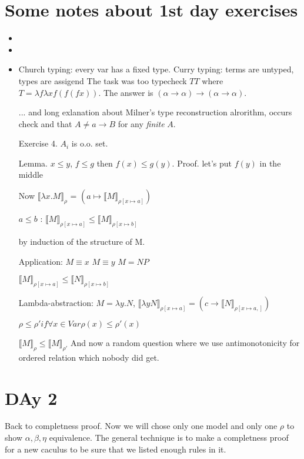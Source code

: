 \documentclass[a4paper,10pt]{book}
\newcommand{\sem}[2]{ \llbracket#1\rrbracket_{#2} }
\begin{document}
\section{Some notes about 1st day exercises}
\begin{itemize}
 \item 
 \item 
 \item Church typing: every var has a fixed type. Curry typing: terms are untyped, types are assigend
 The task was too typecheck $TT$ where $T=\lambda f \lambda x f(f(f x))$. The answer is 
 $(\alpha \rightarrow \alpha) \rightarrow (\alpha \rightarrow \alpha)$.
 
\begin{prooftree}
\end{prooftree}
... and long exlanation about Milner's type reconstruction alrorithm, occurs check and that 
$A \neq a \rightarrow B$ for any \textit{finite} $A$.

Exercise 4.
$A_i$ is o.o. set. 


Lemma. $x \leq y$, $f \leq g$ then $f(x) \leq g(y)$.  Proof. let's put $f(y)$ in the middle



Now 
$\sem{\lambda x . M}{\rho}$ = $(a \mapsto \sem{M}{\rho[x \mapsto a]})$ 

$a \leq b$ : $\sem{M}{\rho[x \mapsto a]} \leq \sem{M}{\rho[x \mapsto b]}$

by induction of the structure of M.

Application: $M \equiv x$ $M\equiv y$ $M=NP$

$\sem{M}{\rho[x \mapsto a]} \leq \sem{N}{\rho[x \mapsto b]}$ 

Lambda-abstraction:
$M = \lambda y . N$, $\sem{\lambda y N}{\rho[x \mapsto a]} = (c \rightarrow \sem{N}{\rho[x\mapsto a, ]})$

$\rho \leq \rho' if \forall x \in Var \rho(x) \leq \rho'(x)$

$\sem{M}{\rho} \leq \sem{M}{\rho'}$ And now a random question where we use antimonotonicity for ordered relation 
which nobody did get.


\end{itemize}


\section{DAy 2}
Back to completness proof. Now we will chose only one model and only one $\rho$ to show 
$\alpha, \beta, \eta$ equivalence. The general technique is to make a completness proof for a new caculus 
to be sure that we listed enough rules in it.
\end{document}
